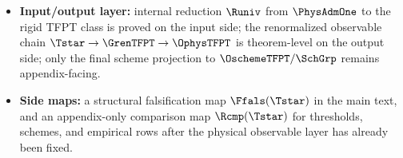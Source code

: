 \begin{tcolorbox}[colback=tfptblue!2, colframe=tfptblue!40, breakable,
    title={Closed theorem surface}, colbacktitle=tfptblue!60]
\begin{itemize}[leftmargin=1.5em, topsep=3pt, itemsep=3pt]
    essential injectivity on the rigid image, and the canonical rigid object $\Tstar$.
    \item \textbf{Input/output layer:} internal reduction $\Runiv$ from $\PhysAdmOne$ to the rigid TFPT class is proved on the input side; the renormalized observable chain $\Tstar\to\GrenTFPT\to\OphysTFPT$ is theorem-level on the output side; only the final scheme projection to $\OschemeTFPT/\SchGrp$ remains appendix-facing.
    \item \textbf{Side maps:} a structural falsification map $\Ffals(\Tstar)$ in the main text, and an appendix-only comparison map $\Rcmp(\Tstar)$ for thresholds, schemes, and empirical rows after the physical observable layer has already been fixed.
\end{itemize}
\end{tcolorbox}

